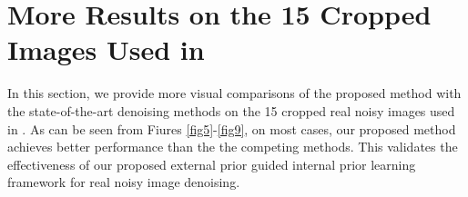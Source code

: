 \documentclass[10pt,onecolumn,letterpaper]{article}
\begin{document}
\section{More Results on the 15 Cropped Images Used in \cite{crosschannel2016}}
In this section, we provide more visual comparisons of the proposed method with the state-of-the-art denoising methods on the 15 cropped real noisy images used in \cite{crosschannel2016}. As can be seen from Fiures \ref{fig5}-\ref{fig9}, on most cases, our proposed method achieves better performance than the the competing methods. This validates the effectiveness of our proposed external prior guided internal prior learning framework for real noisy image denoising.
\end{document}
